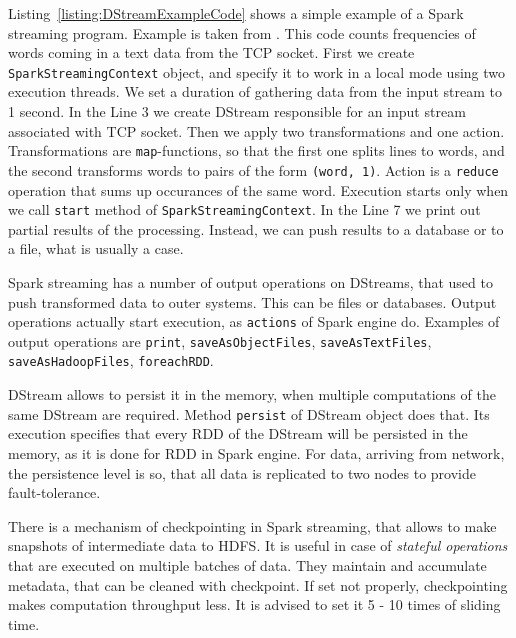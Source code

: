 Listing~\ref{listing:DStreamExampleCode} shows a simple example of a Spark streaming program.
Example is taken from \cite{Spark2}.
This code counts frequencies of words coming in a text data from the TCP socket.
First we create \lstinline{SparkStreamingContext} object, and specify it to work in a local mode using two execution threads.
We set a duration of gathering data from the input stream to 1 second.
In the Line 3 we create DStream responsible for an input stream associated with TCP socket.
Then we apply two transformations and one action.
Transformations are \lstinline{map}-functions, so that the first one splits lines to words, and the second transforms words to pairs of the form \lstinline{(word, 1)}.
Action is a \lstinline{reduce} operation that sums up occurances of the same word.
Execution starts only when we call \lstinline{start} method of \lstinline{SparkStreamingContext}.
In the Line 7 we print out partial results of the processing.
Instead, we can push results to a database or to a file, what is usually a case.

Spark streaming has a number of output operations on DStreams, that used to push transformed data to outer systems.
This can be files or databases.
Output operations actually start execution, as \lstinline{actions} of Spark engine do.
Examples of output operations are \lstinline{print}, \lstinline{saveAsObjectFiles}, \lstinline{saveAsTextFiles}, \lstinline{saveAsHadoopFiles}, \lstinline{foreachRDD}.

DStream allows to persist it in the memory, when multiple computations of the same DStream are required.
Method \lstinline{persist} of DStream object does that.
Its execution specifies that every RDD of the DStream will be persisted in the memory, as it is done for RDD in Spark engine.
For data, arriving from network, the persistence level is so, that all data is replicated to two nodes to provide fault-tolerance.

There is a mechanism of checkpointing in Spark streaming, that allows to make snapshots of intermediate data to HDFS.
It is useful in case of \textit{stateful operations} that are executed on multiple batches of data.
They maintain and accumulate metadata, that can be cleaned with checkpoint.
If set not properly, checkpointing makes computation throughput less.
It is advised to set it 5 - 10 times of sliding time.